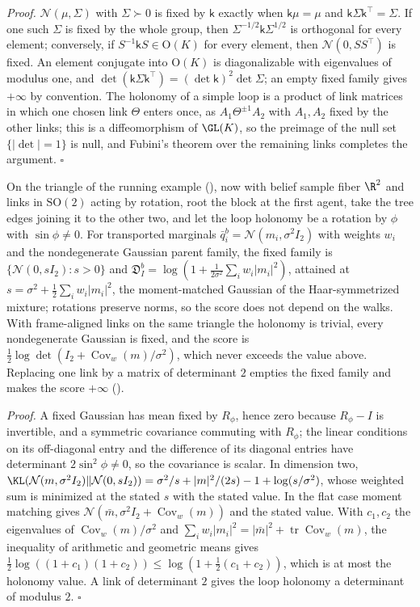 \noindent\emph{Proof.}
$\mathcal N(\mu,\Sigma)$ with $\Sigma\succ0$ is fixed by $\mathsf k$ exactly when $\mathsf k\mu=\mu$ and
$\mathsf k\Sigma\mathsf k^\top=\Sigma$. If one such $\Sigma$ is fixed by the whole group, then
$\Sigma^{-1/2}\mathsf k\Sigma^{1/2}$ is orthogonal for every element; conversely, if
$S^{-1}\mathsf kS\in\mathrm O(K)$ for every element, then $\mathcal N(0,SS^\top)$ is fixed. An element
conjugate into $\mathrm O(K)$ is diagonalizable with eigenvalues of modulus one, and
$\det(\mathsf k\Sigma\mathsf k^\top)=(\det\mathsf k)^2\det\Sigma$; an empty fixed family gives $+\infty$ by
convention. The holonomy of a simple loop is a product of link matrices in which one chosen link $\Theta$
enters once, as $A_1\Theta^{\pm1}A_2$ with $A_1,A_2$ fixed by the other links; this is a diffeomorphism of
$\GL(K)$, so the preimage of the null set $\{\lvert\det\rvert=1\}$ is null, and Fubini's theorem over the
remaining links completes the argument. $\square$

On the triangle of the running example (), now with belief sample fiber
$\R^2$ and links in $\mathrm{SO}(2)$ acting by rotation, root the block at the first agent, take the tree
edges joining it to the other two, and let the loop holonomy be a rotation by $\phi$ with $\sin\phi\neq0$.
For transported marginals $\bar q^b_i=\mathcal N(m_i,\sigma^2I_2)$ with weights $w_i$ and the nondegenerate
Gaussian parent family, the fixed family is $\{\mathcal N(0,sI_2):s>0\}$ and
$\mathfrak D^b_I=\log(1+\tfrac{1}{2\sigma^2}\sum_iw_i\lvert m_i\rvert^2)$, attained at
$s=\sigma^2+\tfrac12\sum_iw_i\lvert m_i\rvert^2$, the moment-matched Gaussian of the Haar-symmetrized
mixture; rotations preserve norms, so the score does not depend on the walks. With frame-aligned links on
the same triangle the holonomy is trivial, every nondegenerate Gaussian is fixed, and the score is
$\tfrac12\log\det(I_2+\operatorname{Cov}_w(m)/\sigma^2)$, which never exceeds the value above. Replacing one
link by a matrix of determinant $2$ empties the fixed family and makes the score $+\infty$
(). 

\noindent\emph{Proof.}
A fixed Gaussian has mean fixed by $R_\phi$, hence zero because $R_\phi-I$ is invertible, and a symmetric
covariance commuting with $R_\phi$; the linear conditions on its off-diagonal entry and the difference of
its diagonal entries have determinant $2\sin^2\phi\neq0$, so the covariance is scalar. In dimension two,
$\KL(\mathcal N(m,\sigma^2I_2)\Vert\mathcal N(0,sI_2))=\sigma^2/s+\lvert m\rvert^2/(2s)-1+\log(s/\sigma^2)$,
whose weighted sum is minimized at the stated $s$ with the stated value. In the flat case moment matching
gives $\mathcal N(\bar m,\sigma^2I_2+\operatorname{Cov}_w(m))$ and the stated value. With $c_1,c_2$ the
eigenvalues of $\operatorname{Cov}_w(m)/\sigma^2$ and
$\sum_iw_i\lvert m_i\rvert^2=\lvert\bar m\rvert^2+\operatorname{tr}\operatorname{Cov}_w(m)$, the inequality of
arithmetic and geometric means gives $\tfrac12\log((1+c_1)(1+c_2))\leq\log(1+\tfrac12(c_1+c_2))$, which is at
most the holonomy value. A link of determinant $2$ gives the loop holonomy a determinant of modulus $2$.
$\square$


